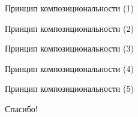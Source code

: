 \documentclass{beamer}
\begin{document}
\begin{frame}{Принцип композициональности (1)}
\end{frame}

\begin{frame}{Принцип композициональности (2)}
\end{frame}

\begin{frame}{Принцип композициональности (3)}
\end{frame}

\begin{frame}{Принцип композициональности (4)}
\end{frame}

\begin{frame}{Принцип композициональности (5)}
\end{frame}


\begin{frame}{}
    \thispagestyle{empty}
    \begin{center}
        {\large Спасибо!}
    \end{center}
\end{frame}


\end{document}
